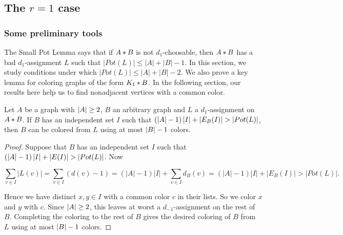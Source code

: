 \subsection{\texorpdfstring{The $r = 1$ case}{The r = 1 case}}
\subsubsection{Some preliminary tools}

The Small Pot Lemma says that if $A \mbox{\hspace{2 pt}$\ast$\hspace{2 pt}} B$ is not $d_1$-choosable, then
$A \mbox{\hspace{2 pt}$\ast$\hspace{2 pt}} B$ has a bad $d_1$-assignment $L$ such that $|Pot(L)|\le |A|+|B|-1$.
In this section, we study conditions under which $|Pot(L)|\le |A|+|B|-2$.  
We also prove a key lemma for coloring graphs of the form $K_1 \mbox{\hspace{2 pt}$\ast$\hspace{2 pt}} B$.
In the following section, our results here help us to find nonadjacent
vertices with a common color.

\begin{lem}\label{MaxindependentCondition}
Let $A$ be a graph with $\left|A\right| \geq 2$, $B$ an arbitrary graph and $L$ a $d_1$-assignment on $A \mbox{\hspace{2 pt}$\ast$\hspace{2 pt}} B$.  If $B$ has an independent set $I$ such that $(\left|A\right| - 1)\left|I\right| + \left|E_B(I)\right| > \left|Pot(L)\right|$, then $B$ can be colored from $L$ using at most $\left|B\right| - 1$ colors.
\end{lem}
\begin{proof}
Suppose that $B$ has an independent set $I$ such that $(\left|A\right| - 1)\left|I\right| + \left|E(I)\right|
> \left|Pot(L)\right|$.  Now

$$
\sum_{v\in I}|L(v)| = \sum_{v\in I}(d(v)-1) 
= (|A|-1)|I| + \sum_{v\in I}d_B(v) = (|A|-1)|I| + |E_B(I)| > |Pot(L)|.
$$

Hence we have distinct $x, y \in I$ with a common color $c$ in their lists.  So
we color $x$ and $y$ with $c$.  Since $\left|A\right| \geq 2$, this leaves at worst a $d_{-1}$-assignment on the rest of $B$.  Completing the coloring to the rest of $B$ gives the desired coloring of $B$ from $L$ using at most $\left|B\right| - 1$ colors.
\end{proof}

